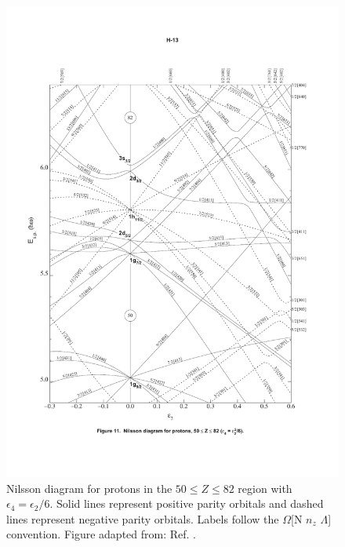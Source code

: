 \begin{figure}
\label{fig:chp2-nillson-protons}
\centerline{\includegraphics[height=0.8\textheight,clip=true,trim=10 100 10 100]{./img/c2/nilsson_proton_diagram.pdf}}
	\caption{Nilsson diagram for protons in the $50\leq Z \leq 82$ region with $\epsilon_4=\epsilon_2/6$. Solid lines represent positive parity orbitals and dashed lines represent negative parity orbitals. Labels follow the $\Omega$[N $n_z$ $\Lambda$] convention. Figure adapted from: Ref. \cite{nilssonDiagrams}.}
\end{figure}

